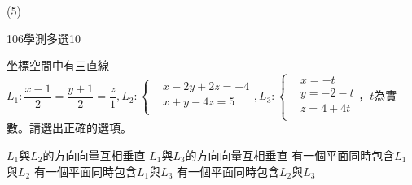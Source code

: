 \begin{QUESTIONS}
\begin{QUESTION}
\begin{QBODY}
\begin{QOPS}
			\end{QOPS}
        \end{QBODY}
        \begin{QFROMS}
        \end{QFROMS}
        \begin{QTAGS}\end{QTAGS}
        \begin{QANS}
            (5)
        \end{QANS}
        \begin{QSOLLIST}
        \end{QSOLLIST}
        \begin{QEMPTYSPACE}
        \end{QEMPTYSPACE}
    \end{QUESTION}
    \begin{QUESTION}
        \begin{ExamInfo}{106}{學測}{多選}{10}
        \end{ExamInfo}
        \begin{ExamAnsRateInfo}{43}{66}{39}{24}
        \end{ExamAnsRateInfo}
        \begin{QBODY}
            坐標空間中有三直線${{L}_{1}}:\dfrac{x-1}{2}=\dfrac{y+1}{2}=\dfrac{z}{1},{{L}_{2}}:\left\{ \begin{aligned}
			& x-2y+2z=-4 \\ 
			& x+y-4z=5 \\ 
			\end{aligned} \right.,{{L}_{3}}:\left\{ \begin{aligned}
			& x=-t \\ 
			& y=-2-t \\ 
			& z=4+4t \\ 
			\end{aligned} \right.$，$t$為實數。請選出正確的選項。
			\begin{QOPS}
				\QOP ${{L}_{1}}$與${{L}_{2}}$的方向向量互相垂直
				\QOP ${{L}_{1}}$與${{L}_{3}}$的方向向量互相垂直
				\QOP 有一個平面同時包含${{L}_{1}}$與${{L}_{2}}$
				\QOP 有一個平面同時包含${{L}_{1}}$與${{L}_{3}}$
				\QOP 有一個平面同時包含${{L}_{2}}$與${{L}_{3}}$
			\end{QOPS}
        \end{QBODY}
        \begin{QFROMS}
        \end{QFROMS}
        \begin{QTAGS}\end{QTAGS}

\end{QUESTION}
\end{QUESTIONS}
